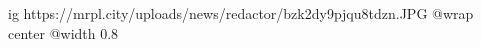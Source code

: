  
 
 
 
 

\ifcmt
  ig https://mrpl.city/uploads/news/redactor/bzk2dy9pjqu8tdzn.JPG
  @wrap center
  @width 0.8
\fi
